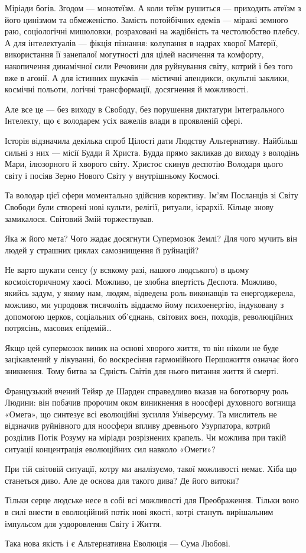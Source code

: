 Міріади богів. Згодом — монотеїзм. А коли теїзм рушиться — приходить атеїзм з
його цинізмом та обмеженістю. Замість потойбічних едемів — міражі земного раю,
соціологічні мишоловки, розраховані на жадібність та честолюбство плебсу. А для
інтелектуалів — фікція пізнання: колупання в надрах хворої Матерії,
використання її занепалої могутності для цілей насичення та комфорту,
накопичення динамічної сили Речовини для руйнування світу, котрий і без того
вже в агонії. А для істинних шукачів — містичні апендикси, окультні заклики,
космічні польоти, логічні трансформації, досягнення й можливості.

Але все це — без виходу в Свободу, без порушення диктатури Інтегрального
Інтелекту, що є володарем усіх важелів влади в проявленій сфері.

Історія відзначила декілька спроб Цілості дати Людству Альтернативу. Найбільш
сильні з них — місії Будди й Христа. Будда прямо закликав до виходу з володінь
Мари, ілюзорного й хворого світу. Христос скинув деспотію Володаря цього світу
і посіяв Зерно Нового Світу у внутрішньому Космосі.

Та володар цієї сфери моментально здійснив корективу. Ім’ям Посланців зі Світу
Свободи були створені нові культи, релігії, ритуали, ієрархії. Кільце знову
замикалося. Світовий Змій торжествував.

Яка ж його мета? Чого жадає досягнути Супермозок Землі? Для чого мучить він
людей у страшних циклах самознищення й руйнацій?

Не варто шукати сенсу (у всякому разі, нашого людського) в цьому
космоісторичному хаосі. Можливо, це злобна впертість Деспота. Можливо, якийсь
задум, у якому нам, людям, відведена роль виконавців та енергоджерела, можливо,
ми упродовж тисячоліть віддаємо йому психоенергію, індуковану з допомогою
церков, соціальних об’єднань, світових воєн, походів, революційних потрясінь,
масових епідемій…

Якщо цей супермозок виник на основі хворого життя, то він ніколи не буде
зацікавлений у лікуванні, бо воскресіння гармонійного Першожиття означає його
зникнення. Тому битва за Єдність Світів для нього питання життя й смерті.

Французький вчений Тейяр де Шарден справедливо вказав на боготворчу роль
Людини: він побачив пророчим оком виникнення в ноосфері духовного вогнища
«Омега», що синтезує всі еволюційні зусилля Універсуму. Та мислитель не
відзначив руйнівного для ноосфери впливу древнього Узурпатора, котрий розділив
Потік Розуму на міріади розрізнених крапель. Чи можлива при такій ситуації
концентрація еволюційних сил навколо «Омеги»?

При тій світовій ситуації, котру ми аналізуємо, такої можливості немає. Хіба що
станеться диво. Але де основа для такого дива? Де його витоки?

Тільки серце людське несе в собі всі можливості для Преображення. Тільки воно в
силі внести в еволюційний потік нові якості, котрі стануть вирішальним
імпульсом для уздоровлення Світу і Життя.

Така нова якість і є Альтернативна Еволюція — Сума Любові.

